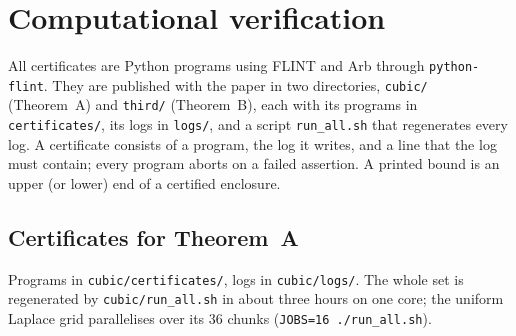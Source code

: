 \section{Computational verification}\label{sec:computations}

All certificates are Python programs using FLINT \cite{FLINT} and Arb \cite{Arb} through \texttt{python-flint}. They are
published with the paper \cite{Code} in two directories, \texttt{cubic/} (Theorem~A) and \texttt{third/} (Theorem~B), each
with its programs in \texttt{certificates/}, its logs in \texttt{logs/}, and a script \texttt{run\_all.sh} that regenerates
every log. A certificate consists of a program, the log it writes, and a line that the log must contain; every program
aborts on a failed assertion. A printed bound is an upper (or lower) end of a certified enclosure.

\subsection{Certificates for Theorem~A}
Programs in \texttt{cubic/certificates/}, logs in \texttt{cubic/logs/}. The whole set is regenerated by
\texttt{cubic/run\_all.sh} in about three hours on one core; the uniform Laplace grid parallelises over its $36$ chunks
(\texttt{JOBS=16 ./run\_all.sh}).

